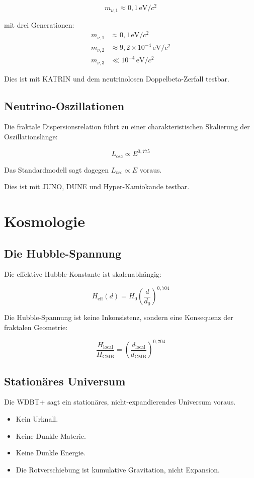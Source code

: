 \[
m_{\nu,1} \approx 0,1 \, \text{eV}/c^2
\]

mit drei Generationen:
\[
\begin{aligned}
m_{\nu,1} &\approx 0,1 \, \text{eV}/c^2 \\
m_{\nu,2} &\approx 9,2 \times 10^{-4} \, \text{eV}/c^2 \\
m_{\nu,3} &\ll 10^{-4} \, \text{eV}/c^2
\end{aligned}
\]

Dies ist mit KATRIN und dem neutrinolosen Doppelbeta-Zerfall testbar.

\subsection{Neutrino-Oszillationen}

Die fraktale Dispersionsrelation führt zu einer charakteristischen Skalierung der Oszillationslänge:

\[
L_{\text{osc}} \propto E^{0,775}
\]

Das Standardmodell sagt dagegen \( L_{\text{osc}} \propto E \) voraus.

Dies ist mit JUNO, DUNE und Hyper-Kamiokande testbar.

\section{Kosmologie}

\subsection{Die Hubble-Spannung}

Die effektive Hubble-Konstante ist skalenabhängig:

\[
H_{\text{eff}}(d) = H_0 \left( \frac{d}{d_0} \right)^{0,704}
\]

Die Hubble-Spannung ist keine Inkonsistenz, sondern eine Konsequenz der fraktalen Geometrie:

\[
\frac{H_{\text{local}}}{H_{\text{CMB}}} = \left( \frac{d_{\text{local}}}{d_{\text{CMB}}} \right)^{0,704}
\]

\subsection{Stationäres Universum}

Die WDBT+ sagt ein stationäres, nicht-expandierendes Universum voraus.

\begin{itemize}
\item Kein Urknall.
\item Keine Dunkle Materie.
\item Keine Dunkle Energie.
\item Die Rotverschiebung ist kumulative Gravitation, nicht Expansion.
\end{itemize}

